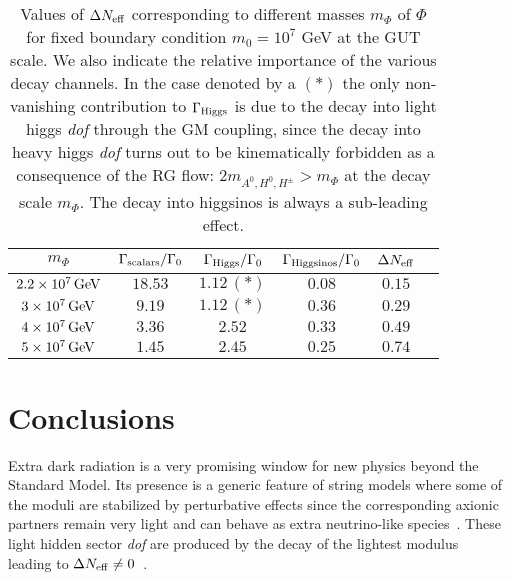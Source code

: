 \documentclass[12pt,a4paper]{book}
\begin{document}
\begin{table}[ht!]
\begin{center}
\begin{tabular}{cccccc}
\hline
$m_\Phi$ & $\Gamma_{\rm scalars}/\Gamma_0$ & $\Gamma_{\rm Higgs}/\Gamma_0$ & $\Gamma_{\rm Higgsinos}/\Gamma_0$ & $\Delta N_{\rm eff}$  \\
\hline
$2.2 \times 10^7 \, \rm GeV$ & $18.53$ & $1.12 \,(*)$ & $0.08$  & $0.15$ \\
\hline
$3 \times 10^7 \, \rm GeV$ & $9.19$ & $1.12 \,(*)$ & $0.36$ & $0.29$ \\
\hline
$4 \times 10^7 \, \rm GeV$ & $3.36$ & $2.52$ & $0.33$ & $0.49$ \\
\hline
$5 \times 10^7 \, \rm GeV$ & $1.45$ & $2.45$ & $0.25$ & $0.74$ \\
\hline
\end{tabular}
\end{center}
\caption{Values of $\Delta N_{\rm eff}$ corresponding to different masses $m_\Phi$ of $\Phi$ for fixed boundary condition $m_0 = 10^7$ GeV at the GUT scale. We also indicate the relative importance of the various decay channels. In the case denoted by a $(*)$ the only non-vanishing contribution to $\Gamma_{\rm Higgs}$ is due to the decay into light higgs \textit{dof} through the GM coupling, since the decay into heavy higgs \textit{dof} turns out to be kinematically forbidden as a consequence of the RG flow: $2 m_{A^0, H^0, H^\pm} > m_\Phi$ at the decay scale $m_\Phi$. The decay into higgsinos is always a sub-leading effect.}
\label{tab1}
\end{table}


\section{Conclusions}
\label{Concl}

Extra dark radiation is a very promising window for new physics beyond the Standard Model. Its presence is a generic feature of string models where some of the moduli are stabilized by perturbative effects since the corresponding axionic partners remain very light and can behave as extra neutrino-like species~\cite{Allahverdi:2014ppa}. These light hidden sector \textit{dof} are produced by the decay of the lightest modulus~\cite{Acharya:2008bk, Acharya:2009zt, Acharya:2010af, Allahverdi:2013noa} leading to $\Delta N_{\rm eff}\neq 0$~\cite{Cicoli:2012aq, Higaki:2012ar, Higaki:2013lra}.\\
\end{document}
